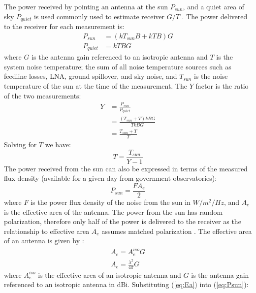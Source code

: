\documentclass{article}
\begin{document}
The power received by pointing an antenna at the sun $P_{sun}$, and a quiet area of sky $P_{quiet}$ is used commonly used to estimate receiver $G/T$ \cite{flagg2006_det_gt}.  The power delivered to the receiver for each measurement is:
\begin{equation}
\begin{split}
P_{sun} &= (kT_{sun}B+kTB)G \\
P_{quiet} &= kTBG 
\end{split}
\end{equation}
where $G$ is the antenna gain referenced to an isotropic antenna and $T$ is the system noise temperature; the sum of all noise temperature sources such as feedline losses, LNA, ground spillover, and sky noise, and $T_{sun}$ is the noise temperature of the sun at the time of the measurement. The $Y$ factor is the ratio of the two  measurements:
\begin{equation}
\begin{split}
Y &= \frac{P_{sun}}{P_{quiet}} \\
  &= \frac{(T_{sun}+T)kBG}{TkBG} \\
  &= \frac{T_{sun}+T}{T} 
\end{split}
\end{equation}
Solving for $T$ we have:
\begin{equation} \label{eq:T}
T = \frac{T_{sun}}{Y-1}
\end{equation}
The power received from the sun can also be expressed in terms of the measured flux density (available for a given day from government observatories):
\begin{equation} \label{eq:Psun}
P_{sun} = \frac{FA_e}{2}
\end{equation}
where $F$ is the power flux density of the noise from the sun in $W/m^2/Hz$, and $A_e$ is the effective area of the antenna. The power from the sun has random polarization, therefore only half of the power is delivered to the receiver as the relationship to effective area $A_e$ assumes matched polarization \cite[p 778]{kraus1988antennas}. The effective area of an antenna is given by \cite[Eq 2.3]{zavrel_antenna_physics}:
\begin{equation}
\begin{split} \label{eq:Ea}
A_e = A_e^{iso}G \\
A_e = \frac{\lambda^2}{4\pi}G
\end{split}
\end{equation}
where $A_e^{iso}$ is the effective area of an isotropic antenna and $G$ is the antenna gain referenced to an isotropic antenna in dBi. Substituting (\ref{eq:Ea}) into (\ref{eq:Psun}):
\end{document}
